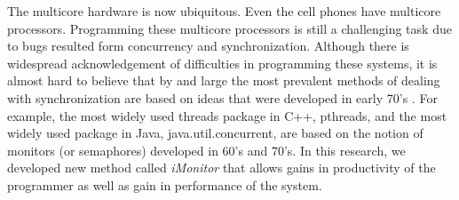 \documentclass[preprint]{sigplanconf}
\begin{document}




The multicore hardware is now ubiquitous. Even the cell phones have
multicore processors. Programming these multicore processors is
still a challenging task due to
bugs resulted form concurrency and synchronization.
Although there is widespread acknowledgement of difficulties 
in programming these systems, it is almost hard to believe that 
by and large the most prevalent methods of dealing with synchronization are
based on ideas that were developed in early 70's \cite{hoa74, han75}. For 
example, the most widely used threads package in C++, pthreads, and
the most widely used package in Java, java.util.concurrent, are based
on the notion of monitors (or semaphores) developed in 60's and 70's.
In this research, we developed new method called {\it iMonitor} 
that allows gains in productivity of the programmer as well as gain in
performance of the system.
\end{document}
